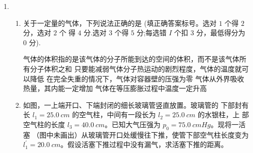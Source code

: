 \begin{enumerate}
\begin{enumerate}


	
\end{enumerate}


\item 
{}
\begin{enumerate}
	\item
关于一定量的气体，下列说法正确的是
 \underlinegap 
(填正确答案标号。选对 $ 1 $ 个得 $ 2 $ 分，选对 $ 2 $ 个
得 $ 4 $ 分.选对 $ 3 $ 个得 $ 5 $ 分;每选错 $ I $ 个扣 $ 3 $ 分，最低得分为 $ 0 $ 分).


\fivechoices
{气体的体积指的是该气体的分子所能到达的空间的体积，而不是该气体所有分子体积之和}
{只要能减弱气体分子热运动的剧烈程度，气体的温度就可以降低}
{在完全失重的情况下，气体对容器壁的压强为零}
{气体从外界吸收热量，其内能一定增加}
{气体在等压膨胀过程中温度一定升高}


\item 
如图，一上端开口、下端封闭的细长玻璃管竖直放置。玻璃管的
下部封有长 $ l_{1} =25.0 \ cm $ 的空气柱，中间有一段长为 $ l_{2} =25.0 \ cm $ 的水银柱，上
部空气柱的长度 $ l_{3} =40.0 \ cm $。已知大气压强为 $ p_{0} =75.0 \ cm Hg $。现将一活塞
（图中未画出）从玻璃管开口处缓慢往下推，使管下部空气柱长度变为
$ l_{1} ^{\prime} =20.0 \ cm $。假设活塞下推过程中没有漏气，求活塞下推的距离。
\begin{figure}[h!]
	\flushright
	
\end{figure}



\end{enumerate}
\end{enumerate}
